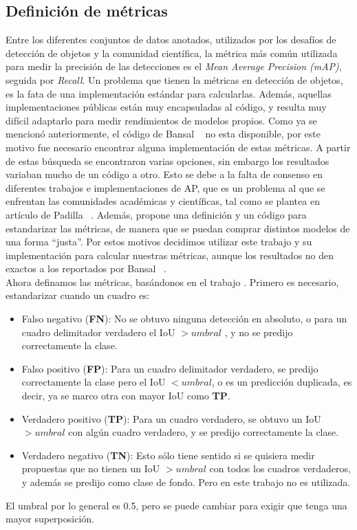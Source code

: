 \subsection{Definición de métricas} \label{ssec:definiciondemetricas}
Entre los diferentes conjuntos de datos anotados, utilizados por los desafíos de detección de objetos y la comunidad científica, la métrica más común utilizada para medir la precisión de las detecciones es el  \textit{Mean Average Precision (mAP)}, seguida por \textit{Recall}. Un problema que tienen la métricas en detección de objetos, es la fata de una implementación estándar para calcularlas. Además, aquellas implementaciones públicas están muy encapsuladas al código, y resulta muy difícil adaptarlo para medir rendimientos de modelos propios. Como ya se mencionó anteriormente, el código de Bansal \etal~\cite{bansal2018zero} no esta disponible, por este motivo fue necesario encontrar alguna implementación de estas métricas. A partir de estas búsqueda se encontraron varias opciones, sin embargo los resultados variaban mucho de un código a otro. Esto se debe a la falta de consenso en diferentes trabajos e implementaciones de AP, que es un problema al que se enfrentan las comunidades académicas y científicas, tal como se plantea en artículo de Padilla \etal~\cite{padilla2020survey}. Además, propone una definición y un código para estandarizar las métricas, de manera que se puedan comprar distintos modelos de una forma ``justa''. Por estos motivos decidimos utilizar este trabajo y su implementación para calcular nuestras métricas, aunque los resultados no den exactos a los reportados por Bansal \etal~\cite{bansal2018zero}.\\

Ahora definamos las métricas, basándonos en el trabajo \cite{padilla2020survey}. Primero es necesario, estandarizar cuando un cuadro es:
\begin{itemize}
	\item Falso negativo (\textbf{FN}): No se obtuvo ninguna detección en absoluto, o para un cuadro delimitador verdadero el IoU $> umbral$ , y no se predijo correctamente la clase.
	\item Falso positivo (\textbf{FP}): Para un cuadro delimitador verdadero, se predijo correctamente la clase pero el IoU $< umbral$, o es un predicción duplicada, es decir, ya se marco otra con mayor IoU como \textbf{TP}.
	\item Verdadero positivo (\textbf{TP}): Para un cuadro verdadero, se obtuvo un IoU $> umbral$ con algún cuadro verdadero, y se predijo correctamente la clase.
	\item Verdadero negativo (\textbf{TN}): Esto sólo tiene sentido si se quisiera medir propuestas que no tienen un IoU $> umbral$ con todos los cuadros verdaderos, y además se predijo como clase de fondo. Pero en este trabajo no es utilizada.
\end{itemize}
El umbral por lo general es 0.5, pero se puede cambiar para exigir que tenga una mayor superposición.\\


